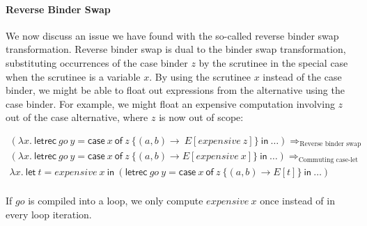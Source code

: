 \documentclass[acmsmall,review,anonymous]{acmart}
\newcommand{\llet}[2]{\mathsf{let}~#1~\mathsf{in}~#2}
\newcommand{\lletrec}[2]{\mathsf{letrec}~#1~\mathsf{in}~#2}
\newcommand{\ccase}[2]{\mathsf{case}~#1~\mathsf{of}~#2}
\begin{document}
% 

\paragraph{Reverse Binder Swap\label{sec:reverse-binder-swap-considered-harmful}}

We now discuss an issue we have found with the so-called reverse binder swap
transformation.
%
%
Reverse binder swap is dual to the binder swap transformation,
substituting occurrences of the case
binder $z$ by the scrutinee in the special case when the scrutinee is a
variable $x$.
%
By
using the scrutinee $x$ instead of the case binder, we might be able to float
out expressions from the alternative using the case binder. For example, we
might float an expensive computation involving $z$ out of the case alternative,
where $z$ is now out of scope:

{\small\[
\begin{array}{l}
(\lambda x.~\lletrec{go~y = \ccase{x}{z~\{(a,b) \to \ E[expensive~z] \} }}{\dots})
\Longrightarrow_\textrm{Reverse binder swap}\\
(\lambda x.~\lletrec{go~y = \ccase{x}{z~\{(a,b) \to E[expensive~x] \} }}{\dots})
\Longrightarrow_\textrm{Commuting case-let}\\
\lambda x.~\llet{t = \mathit{expensive}~x}{(\lletrec{go~y = \ccase{x}{z~\{(a,b) \to E[t] \} }}{\dots})}\\
\end{array}
\]}

\noindent If $go$ is compiled into a loop, we only compute
$\mathit{expensive}~x$ once instead of in every loop iteration.
\end{document}
